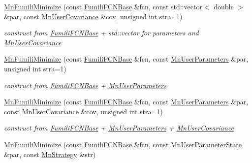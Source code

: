 \begin{DoxyCompactItemize}
\mbox{\hyperlink{classROOT_1_1Minuit2_1_1MnFumiliMinimize_a48eae3f1c5b8eef3b6940d3fd5d26af8}{Mn\+Fumili\+Minimize}} (const \mbox{\hyperlink{classROOT_1_1Minuit2_1_1FumiliFCNBase}{Fumili\+F\+C\+N\+Base}} \&fcn, const std\+::vector$<$ double $>$ \&par, const \mbox{\hyperlink{classROOT_1_1Minuit2_1_1MnUserCovariance}{Mn\+User\+Covariance}} \&cov, unsigned int stra=1)
\begin{DoxyCompactList}\small\item\em construct from \mbox{\hyperlink{classROOT_1_1Minuit2_1_1FumiliFCNBase}{Fumili\+F\+C\+N\+Base}} + std\+::vector for parameters and \mbox{\hyperlink{classROOT_1_1Minuit2_1_1MnUserCovariance}{Mn\+User\+Covariance}} \end{DoxyCompactList}\item 
\mbox{\hyperlink{classROOT_1_1Minuit2_1_1MnFumiliMinimize_aec4f0adff373393b4023f3a783b7d4bd}{Mn\+Fumili\+Minimize}} (const \mbox{\hyperlink{classROOT_1_1Minuit2_1_1FumiliFCNBase}{Fumili\+F\+C\+N\+Base}} \&fcn, const \mbox{\hyperlink{classROOT_1_1Minuit2_1_1MnUserParameters}{Mn\+User\+Parameters}} \&par, unsigned int stra=1)
\begin{DoxyCompactList}\small\item\em construct from \mbox{\hyperlink{classROOT_1_1Minuit2_1_1FumiliFCNBase}{Fumili\+F\+C\+N\+Base}} + \mbox{\hyperlink{classROOT_1_1Minuit2_1_1MnUserParameters}{Mn\+User\+Parameters}} \end{DoxyCompactList}\item 
\mbox{\hyperlink{classROOT_1_1Minuit2_1_1MnFumiliMinimize_a3dd4f225ca0cdfdc6eb542ee32667984}{Mn\+Fumili\+Minimize}} (const \mbox{\hyperlink{classROOT_1_1Minuit2_1_1FumiliFCNBase}{Fumili\+F\+C\+N\+Base}} \&fcn, const \mbox{\hyperlink{classROOT_1_1Minuit2_1_1MnUserParameters}{Mn\+User\+Parameters}} \&par, const \mbox{\hyperlink{classROOT_1_1Minuit2_1_1MnUserCovariance}{Mn\+User\+Covariance}} \&cov, unsigned int stra=1)
\begin{DoxyCompactList}\small\item\em construct from \mbox{\hyperlink{classROOT_1_1Minuit2_1_1FumiliFCNBase}{Fumili\+F\+C\+N\+Base}} + \mbox{\hyperlink{classROOT_1_1Minuit2_1_1MnUserParameters}{Mn\+User\+Parameters}} + \mbox{\hyperlink{classROOT_1_1Minuit2_1_1MnUserCovariance}{Mn\+User\+Covariance}} \end{DoxyCompactList}\item 
\mbox{\hyperlink{classROOT_1_1Minuit2_1_1MnFumiliMinimize_ad8292150eb4f2642fb583f0cec00ed7b}{Mn\+Fumili\+Minimize}} (const \mbox{\hyperlink{classROOT_1_1Minuit2_1_1FumiliFCNBase}{Fumili\+F\+C\+N\+Base}} \&fcn, const \mbox{\hyperlink{classROOT_1_1Minuit2_1_1MnUserParameterState}{Mn\+User\+Parameter\+State}} \&par, const \mbox{\hyperlink{classROOT_1_1Minuit2_1_1MnStrategy}{Mn\+Strategy}} \&str)

\end{DoxyCompactItemize}
